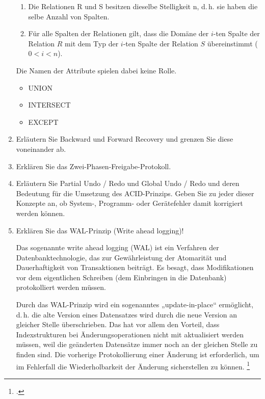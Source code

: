 \documentclass{lehramt-informatik-aufgabe}
\begin{document}
\begin{enumerate}
\begin{antwort}
\begin{enumerate}
\item Die Relationen R und S besitzen dieselbe Stelligkeit n, d.\,h. sie
haben die selbe Anzahl von Spalten.

\item Für alle Spalten der Relationen gilt, dass die Domäne der $i$-ten
Spalte der Relation $R$ mit dem Typ der $i$-ten Spalte der Relation $S$
übereinstimmt ($0 < i < n$).
\end{enumerate}

Die Namen der Attribute spielen dabei keine Rolle.


\begin{itemize}
\item UNION
\item INTERSECT
\item EXCEPT
\end{itemize}
\end{antwort}

%

\item Erläutern Sie Backward und Forward Recovery und grenzen Sie diese
voneinander ab.

%

\item Erklären Sie das Zwei-Phasen-Freigabe-Protokoll.

%

\item Erläutern Sie Partial Undo / Redo und Global Undo / Redo und deren
Bedeutung für die Umsetzung des ACID-Prinzips. Geben Sie zu jeder dieser
Konzepte an, ob System-, Programm- oder Gerätefehler damit korrigiert
werden können.

%

\item Erklären Sie das WAL-Prinzip (Write ahead logging)!

\begin{antwort}
Das sogenannte write ahead logging (WAL) ist ein Verfahren der
Datenbanktechnologie, das zur Gewährleistung der Atomarität und
Dauerhaftigkeit von Transaktionen beiträgt. Es besagt, dass
Modifikationen vor dem eigentlichen Schreiben (dem Einbringen in die
Datenbank) protokolliert werden müssen.

Durch das WAL-Prinzip wird ein sogenanntes „update-in-place“ ermöglicht,
d.\,h. die alte Version eines Datensatzes wird durch die neue Version an
gleicher Stelle überschrieben. Das hat vor allem den Vorteil, dass
Indexstrukturen bei Änderungsoperationen nicht mit aktualisiert werden
müssen, weil die geänderten Datensätze immer noch an der gleichen Stelle
zu finden sind. Die vorherige Protokollierung einer Änderung ist
erforderlich, um im Fehlerfall die Wiederholbarkeit der Änderung
sicherstellen zu können.
\footcite{wiki:wal-prinzip}
\end{antwort}


\end{enumerate}
\end{document}

